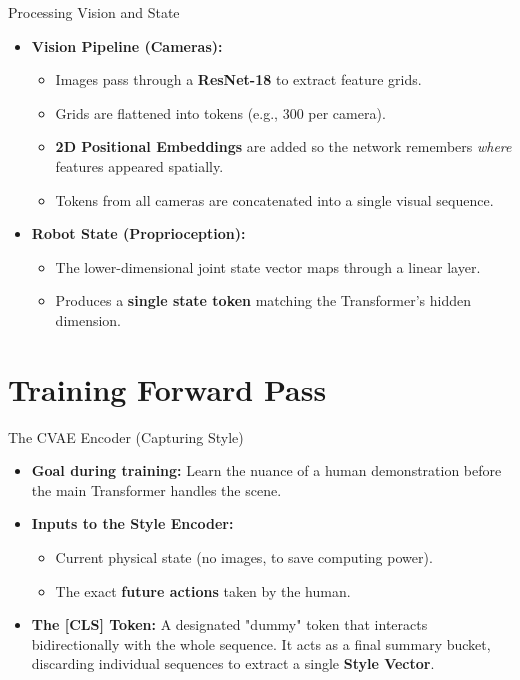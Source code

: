 \documentclass[11pt, aspectratio=169]{beamer}
\begin{document}
\begin{frame}{Processing Vision and State}
    \begin{itemize}
        \item \textbf{Vision Pipeline (Cameras):}
        \begin{itemize}
            \item Images pass through a \textbf{ResNet-18} to extract feature grids.
            \item Grids are flattened into tokens (e.g., 300 per camera).
            \item \textbf{2D Positional Embeddings} are added so the network remembers \textit{where} features appeared spatially.
            \item Tokens from all cameras are concatenated into a single visual sequence.
        \end{itemize}
        \item \textbf{Robot State (Proprioception):}
        \begin{itemize}
            \item The lower-dimensional joint state vector maps through a linear layer.
            \item Produces a \textbf{single state token} matching the Transformer's hidden dimension.
        \end{itemize}
    \end{itemize}
\end{frame}

\section{Training Forward Pass}

\begin{frame}{The CVAE Encoder (Capturing Style)}
    \begin{itemize}
        \item \textbf{Goal during training:} Learn the nuance of a human demonstration before the main Transformer handles the scene.
        \item \textbf{Inputs to the Style Encoder:} 
        \begin{itemize}
            \item Current physical state (no images, to save computing power).
            \item The exact \textbf{future actions} taken by the human.
        \end{itemize}
        \item \textbf{The [CLS] Token:} A designated "dummy" token that interacts bidirectionally with the whole sequence. It acts as a final summary bucket, discarding individual sequences to extract a single \textbf{Style Vector}.
    \end{itemize}
\end{frame}
\end{document}
